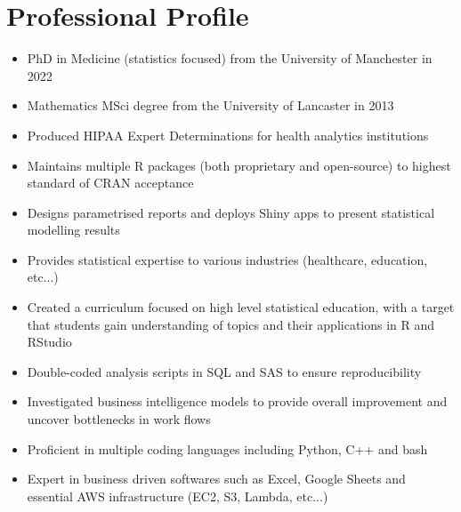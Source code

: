 \documentclass[11pt]{article}
\begin{document}
%
%
%
%

\section{Professional Profile}
\begin{itemize}
\item PhD in Medicine (statistics focused) from the University of Manchester in 2022
\item Mathematics MSci degree from the University of Lancaster in 2013
\item Produced HIPAA Expert Determinations for health analytics institutions
\item Maintains multiple R packages (both proprietary and open-source) to highest standard of CRAN acceptance
\item Designs parametrised reports and deploys Shiny apps to present statistical modelling results
\item Provides statistical expertise to various industries (healthcare, education, etc...)
\item Created a curriculum focused on high level statistical education, with a target that students gain understanding of topics and their applications in R and RStudio
\item Double-coded analysis scripts in SQL and SAS to ensure reproducibility
\item Investigated business intelligence models to provide overall improvement and uncover bottlenecks in work flows
\item Proficient in multiple coding languages including Python, C++ and bash
\item Expert in business driven softwares such as Excel, Google Sheets and essential AWS infrastructure (EC2, S3, Lambda, etc...)
\end{itemize}
\end{document}
